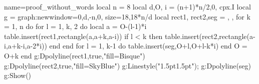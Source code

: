 \documentclass{standalone}%
\begin{document}
\begin{luadraw}{name=proof_without_words}
local n = 8
local d,O, i = (n+1)*n/2,0, cpx.I
local g = graph:new{window={0,d,-n,0}, size={18,18*n/d}}
local rect1, rect2,seg = {}, {}, {}
for k = 1, n do
    for l = 1, k, 2 do 
        local a = O-(l-1)*i
        table.insert(rect1,rectangle(a,a+k,a-i))
        if l < k then table.insert(rect2,rectangle(a-i,a+k-i,a-2*i)) end
    end
    for l = 1, k-1 do table.insert(seg,{O+l,O+l-k*i}) end
    O = O+k
end
g:Dpolyline(rect1,true,"fill=Bisque")
g:Dpolyline(rect2,true,"fill=SkyBlue")
g:Linestyle("{1.5pt}{1.5pt}"); g:Dpolyline(seg)
g:Show()
\end{luadraw}
\end{document}
